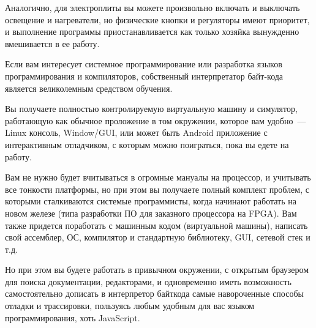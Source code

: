 Аналогично, для электроплиты вы можете произвольно включать и выключать
освещение и нагреватели, но физические кнопки и регуляторы имеют приоритет, и
выполнение программы приостанавливается как только хозяйка вынужденно
вмешивается в ее работу.

\clearpage
{}

Если вам интересует системное программирование или разработка языков
программирования и компиляторов, собственный интерпретатор байт-кода является
великолемным средством обучения.

Вы получаете полностью контролируемую виртуальную машину и симулятор, работающую
как обычное проложение в том окружении, которое вам удобно\ --- Linux консоль,
Window/GUI, или может быть Android приложение с интерактивным отладчиком, с
которым можно поиграться, пока вы едете на работу.

Вам не нужно будет вчитываться в огромные мануалы на процессор, и учитывать все
тонкости платформы, но при этом вы получаете полный комплект проблем, с которыми
сталкиваются системые программисты, когда начинают работать на новом железе
(типа разработки ПО для заказного процессора на FPGA). Вам также придется
поработать с машинным кодом (виртуальной машины), написать свой ассемблер, ОС,
компилятор и стандартную библиотеку, GUI, сетевой стек и т.д.

Но при этом вы будете работать в привычном окружении, с открытым браузером для
поиска документации, редакторами, и одновременно иметь возможность
самостоятельно дописать в интерпретор байткода самые навороченные способы
отладки и трассировки, пользуясь любым удобным для вас языком программирования,
хоть JavaScript.

\secup
